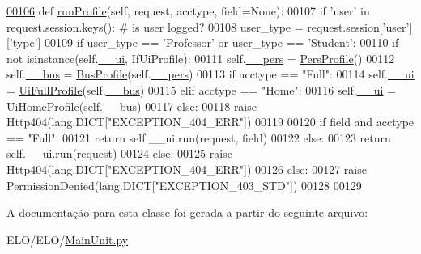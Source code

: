 \begin{DoxyCode}
\hypertarget{classELO_1_1MainUnit_1_1Factory_l00106}{}\hyperlink{classELO_1_1MainUnit_1_1Factory_ab20a76f74180fc77c6b8fcd8de7942f1}{00106}     \textcolor{keyword}{def }\hyperlink{classELO_1_1MainUnit_1_1Factory_ab20a76f74180fc77c6b8fcd8de7942f1}{runProfile}(self, request, acctype, field=None):
00107         \textcolor{keywordflow}{if} \textcolor{stringliteral}{'user'} \textcolor{keywordflow}{in} request.session.keys(): \textcolor{comment}{# is user logged?}
00108             user\_type = request.session[\textcolor{stringliteral}{'user'}][\textcolor{stringliteral}{'type'}]
00109             \textcolor{keywordflow}{if} user\_type == \textcolor{stringliteral}{'Professor'} \textcolor{keywordflow}{or} user\_type == \textcolor{stringliteral}{'Student'}:
00110                 \textcolor{keywordflow}{if} \textcolor{keywordflow}{not} isinstance(self.\hyperlink{classELO_1_1MainUnit_1_1Factory_a189a44a11e1a66ba69663eb2c598dd7c}{\_\_ui}, IfUiProfile):
00111                     self.\hyperlink{classELO_1_1MainUnit_1_1Factory_a68f6640ad3b515e1b8cd48d1554c0779}{\_\_pers} = \hyperlink{classProfile_1_1ProfileUnit_1_1PersProfile}{PersProfile}()
00112                     self.\hyperlink{classELO_1_1MainUnit_1_1Factory_a6a0b7b93046e095779ba54e0a8a4d02c}{\_\_bus} = \hyperlink{classProfile_1_1ProfileUnit_1_1BusProfile}{BusProfile}(self.\hyperlink{classELO_1_1MainUnit_1_1Factory_a68f6640ad3b515e1b8cd48d1554c0779}{\_\_pers})
00113                 \textcolor{keywordflow}{if} acctype == \textcolor{stringliteral}{"Full"}:
00114                     self.\hyperlink{classELO_1_1MainUnit_1_1Factory_a189a44a11e1a66ba69663eb2c598dd7c}{\_\_ui} = \hyperlink{classProfile_1_1ProfileUnit_1_1UiFullProfile}{UiFullProfile}(self.\hyperlink{classELO_1_1MainUnit_1_1Factory_a6a0b7b93046e095779ba54e0a8a4d02c}{\_\_bus})
00115                 \textcolor{keywordflow}{elif} acctype == \textcolor{stringliteral}{"Home"}:
00116                     self.\hyperlink{classELO_1_1MainUnit_1_1Factory_a189a44a11e1a66ba69663eb2c598dd7c}{\_\_ui} = \hyperlink{classProfile_1_1ProfileUnit_1_1UiHomeProfile}{UiHomeProfile}(self.\hyperlink{classELO_1_1MainUnit_1_1Factory_a6a0b7b93046e095779ba54e0a8a4d02c}{\_\_bus})
00117                 \textcolor{keywordflow}{else}:
00118                     \textcolor{keywordflow}{raise} Http404(lang.DICT[\textcolor{stringliteral}{"EXCEPTION\_404\_ERR"}])
00119             
00120                 \textcolor{keywordflow}{if} field \textcolor{keywordflow}{and} acctype == \textcolor{stringliteral}{"Full"}:
00121                     \textcolor{keywordflow}{return} self.\_\_ui.run(request, field)
00122                 \textcolor{keywordflow}{else}:
00123                     \textcolor{keywordflow}{return} self.\_\_ui.run(request)
00124             \textcolor{keywordflow}{else}:
00125                 \textcolor{keywordflow}{raise} Http404(lang.DICT[\textcolor{stringliteral}{"EXCEPTION\_404\_ERR"}])
00126         \textcolor{keywordflow}{else}:
00127             \textcolor{keywordflow}{raise} PermissionDenied(lang.DICT[\textcolor{stringliteral}{"EXCEPTION\_403\_STD"}])
00128         
00129 
\end{DoxyCode}


A documentação para esta classe foi gerada a partir do seguinte arquivo\+:\begin{DoxyCompactItemize}
\item 
E\+L\+O/\+E\+L\+O/\hyperlink{MainUnit_8py}{Main\+Unit.\+py}\end{DoxyCompactItemize}
